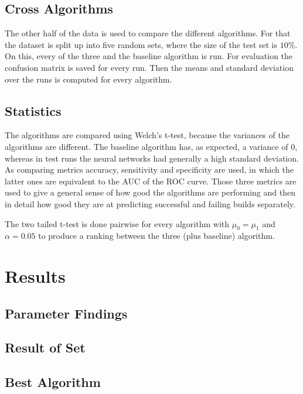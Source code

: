 \documentclass[a4paper,11pt]{article}
\begin{document}
\subsection{Cross Algorithms}

The other half of the data is used to compare the different algorithms. For that the dataset is split up into five random sets, where the size of the test set is $10\%$. On this, every of the three and the baseline algorithm is run. For evaluation the confusion matrix is saved for every run. Then the means and standard deviation over the runs is computed for every algorithm.


\subsection{Statistics}

The algorithms are compared using Welch's t-test, because the variances of the algorithms are different. The baseline algorithm has, as expected, a variance of 0, whereas in test runs the neural networks had generally a high standard deviation. As comparing metrics accuracy, sensitivity and specificity are used, in which the latter ones are equivalent to the AUC of the ROC curve. Those three metrics are used to give a general sense of how good the algorithms are performing and then in detail how good they are at predicting successful and failing builds separately. 

The two tailed t-test is done pairwise for every algorithm with $\mu_0 = \mu_1$ and $\alpha=0.05$ to produce a ranking between the three (plus baseline) algorithm. 


\section{Results}

\subsection{Parameter Findings}

\subsection{Result of Set}

\subsection{Best Algorithm}
\end{document}
